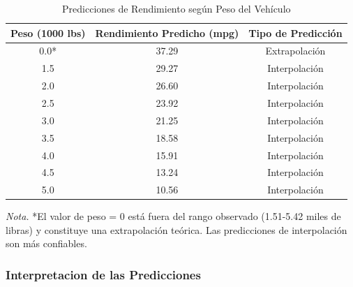 \documentclass[12pt, letterpaper]{article}
\begin{document}
    \begin{table}[H]
        \centering
        \caption{Predicciones de Rendimiento según Peso del Vehículo}
        \begin{tabular}{@{}ccc@{}}
            \toprule 
            \textbf{Peso (1000 lbs)} & \textbf{Rendimiento Predicho (mpg)} & \textbf{Tipo de Predicción} \\
            \midrule 
            0.0*                     & 37.29                               & Extrapolación              \\
            1.5                      & 29.27                               & Interpolación              \\
            2.0                      & 26.60                               & Interpolación              \\
            2.5                      & 23.92                               & Interpolación              \\
            3.0                      & 21.25                               & Interpolación              \\
            3.5                      & 18.58                               & Interpolación              \\
            4.0                      & 15.91                               & Interpolación              \\
            4.5                      & 13.24                               & Interpolación              \\
            5.0                      & 10.56                               & Interpolación              \\
            \bottomrule
        \end{tabular}
        \label{tab:predicciones}
        
        \vspace{0.2cm}
        \textit{Nota.} *El valor de peso = 0 está fuera del rango observado (1.51-5.42 miles de libras) 
        y constituye una extrapolación teórica. Las predicciones de interpolación son más confiables.
    \end{table}

    \subsubsection{Interpretacion de las Predicciones}
\end{document}

